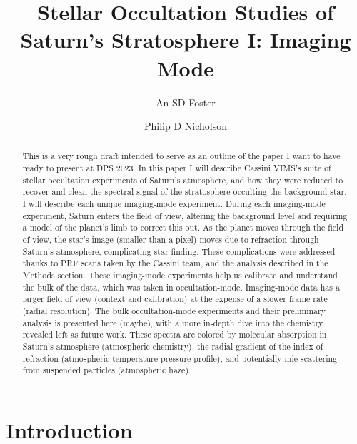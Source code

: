 \documentclass[twocolumn, twocolappendix, numberedappendix, linenumbers]{aastex631}
\begin{document}
\title{Stellar Occultation Studies of Saturn's Stratosphere I: Imaging Mode}
\author[1234-5678-8765-4321]{An SD Foster}

\author[1234-5678-8765-4321]{Philip D Nicholson}

\begin{abstract}

This is a very rough draft intended to serve as an outline of the paper
I want to have ready to present at DPS 2023. In this paper I will describe
Cassini VIMS's suite of stellar occultation experiments of Saturn's atmosphere,
and how they were reduced to recover and clean the spectral signal of the
stratosphere occulting the background star. I will describe each unique imaging-mode
experiment. During each imaging-mode experiment, Saturn enters the field of view,
altering the background level and requiring a model of the planet's limb to correct
this out. As the planet moves through the field of view, the star's image
(smaller than a pixel) moves due to refraction through Saturn's atmosphere,
complicating star-finding. These complications were addressed thanks to PRF scans
taken by the Cassini team, and the analysis described in the Methods section.
These imaging-mode experiments help us calibrate and understand the bulk of the
data, which was taken in occultation-mode. Imaging-mode data has a larger field
of view (context and calibration) at the expense of a slower frame rate (radial resolution).
The bulk occultation-mode experiments and their preliminary analysis is presented
here (maybe), with a more in-depth dive into the chemistry revealed left as future work.
These spectra are colored by molecular absorption in Saturn's atmosphere
(atmospheric chemistry), the radial gradient of the index of refraction
(atmospheric temperature-pressure profile), and potentially mie scattering
from suspended particles (atmospheric haze).

\end{abstract}


\section{Introduction} \label{sec:intro}
\end{document}
